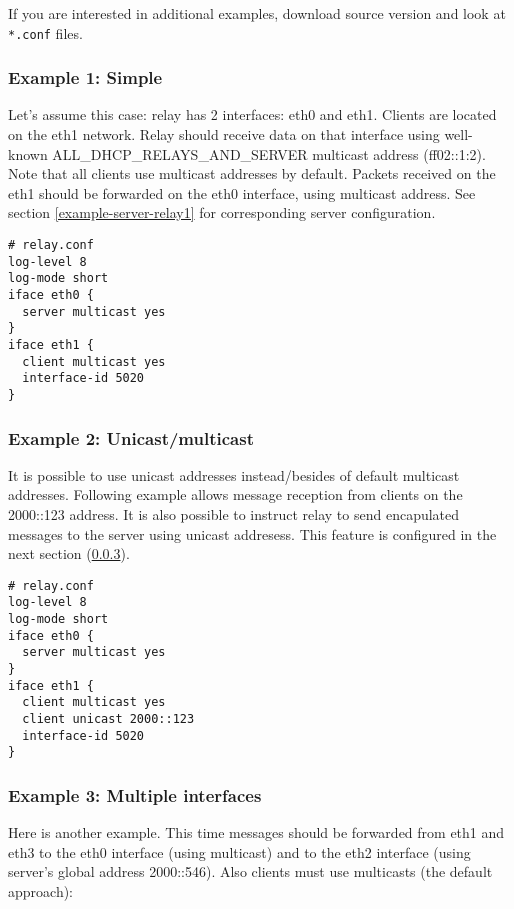 If you are interested in additional examples, download source version
and look at \verb+*.conf+ files.

\subsubsection{Example 1: Simple}
\label{example-relay-1}
Let's assume this case: relay has 2 interfaces: eth0 and
eth1. Clients are located on the eth1 network. Relay should receive
data on that interface using well-known ALL\_DHCP\_RELAYS\_AND\_SERVER
multicast address (ff02::1:2). Note that all clients use multicast
addresses by default. Packets received on the eth1 should be
forwarded on the eth0 interface, using multicast address. See section
\ref{example-server-relay1} for corresponding server configuration.

\begin{lstlisting}
# relay.conf
log-level 8
log-mode short
iface eth0 {
  server multicast yes
}
iface eth1 {
  client multicast yes
  interface-id 5020
}
\end{lstlisting}

\subsubsection{Example 2: Unicast/multicast}
It is possible to use unicast addresses instead/besides of default
multicast addresses. Following example allows message reception from
clients on the 2000::123 address. It is also possible to instruct
relay to send encapulated messages to the server using unicast
addresess. This feature is configured in the next section
(\ref{example-relay-multiple}).

\begin{lstlisting}
# relay.conf
log-level 8
log-mode short
iface eth0 {
  server multicast yes
}
iface eth1 {
  client multicast yes
  client unicast 2000::123
  interface-id 5020
}
\end{lstlisting}

\subsubsection{Example 3: Multiple interfaces}
\label{example-relay-multiple}
Here is another example. This time messages should be forwarded from
eth1 and eth3 to the eth0 interface (using multicast) and to the eth2
interface (using server's global address 2000::546). Also clients must
use multicasts (the default approach):

